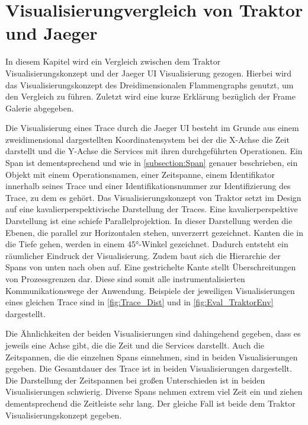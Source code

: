 \section{Visualisierungvergleich von Traktor und Jaeger}
\label{section:Visualisierungvergleich von Traktor und Jaeger}

In diesem Kapitel wird ein Vergleich zwischen dem Traktor Visualisierungskonzept und der Jaeger UI Visualisierung gezogen. Hierbei wird das Visualisierungskonzept des Dreidimensionalen Flammengraphs genutzt, um den Vergleich zu führen. Zuletzt wird eine kurze Erklärung bezüglich der Frame Galerie abgegeben.

 Die Visualisierung eines Trace durch die Jaeger UI besteht im Grunde aus einem zweidimensional dargestellten Koordinatensystem bei der die X-Achse die Zeit darstellt und die Y-Achse die Services mit ihren durchgeführten Operationen. Ein Span ist dementsprechend und wie in \cref{subsection:Span} genauer beschrieben, ein Objekt mit einem Operationsnamen, einer Zeitspanne, einem Identifikator innerhalb seines Trace und einer Identifikationsnummer zur Identifizierung des Trace, zu dem es gehört. Das Visualisierungskonzept von Traktor setzt im Design auf eine kavalierperspektivische Darstellung der Traces. Eine kavalierperspektive Darstellung ist eine schiefe Parallelprojektion. In dieser Darstellung werden die Ebenen, die parallel zur Horizontalen stehen, unverzerrt gezeichnet. Kanten die in die Tiefe gehen, werden in einem \ang{45}-Winkel gezeichnet. Dadurch entsteht ein räumlicher Eindruck der Visualisierung. Zudem baut sich die Hierarchie der Spans von unten nach oben auf. Eine gestrichelte Kante stellt Überschreitungen von Prozessgrenzen dar. Diese sind somit alle instrumentalisierten Kommunikationswege der Anwendung. Beispiele der jeweiligen Visualisierungen eines gleichen Trace sind in \cref{fig:Trace_Dist} und in \cref{fig:Eval_TraktorEnv} dargestellt. 

Die Ähnlichkeiten der beiden Visualisierungen sind dahingehend gegeben, dass es jeweils eine Achse gibt, die die Zeit und die Services darstellt. Auch die Zeitspannen, die die einzelnen Spans einnehmen, sind in beiden Visualisierungen gegeben. Die Gesamtdauer des Trace ist in beiden Visualisierungen dargestellt. Die Darstellung der Zeitspannen bei großen Unterschieden ist in beiden Visualisierungen schwierig. Diverse Spans nehmen extrem viel Zeit ein und ziehen dementsprechend die Zeitleiste sehr lang. Der gleiche Fall ist beide dem Traktor Visualisierungskonzept gegeben. 

